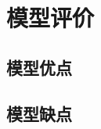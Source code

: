 \documentclass[withoutpreface,bwprint]{cumcmthesis} %
\begin{document}
\section{模型评价}
\subsection{模型优点}

\subsection{模型缺点}




\begin{appendices}
\end{appendices}
\end{document}
